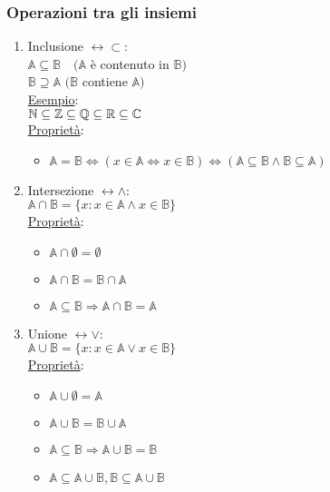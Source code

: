 \documentclass{article}
\begin{document}
\subsubsection*{Operazioni tra gli insiemi}
\begin{enumerate}
	\item Inclusione $\leftrightarrow\subset$:\\
		  $\mathbb{A}\subseteq\mathbb{B}\quad(\mathbb{A}$ è contenuto in $\mathbb{B})$\\
		  $\mathbb{B}\supseteq\mathbb{A}$ $(\mathbb{B}$ contiene $\mathbb{A})$\\
		  \underline{Esempio}:\\
		  $\mathbb{N}\subseteq\mathbb{Z}\subseteq\mathbb{Q}\subseteq\mathbb{R}\subseteq\mathbb{C}$\\
		  \underline{Proprietà}:
		  \begin{itemize}
			  \item $\mathbb{A}=\mathbb{B}\Leftrightarrow(x\in\mathbb{A}\Leftrightarrow x\in\mathbb{B})\Leftrightarrow(\mathbb{A}\subseteq\mathbb{B}\wedge\mathbb{B}\subseteq\mathbb{A})$
		  \end{itemize}
	\item Intersezione $\leftrightarrow\wedge$:\\
		  $\mathbb{A}\cap\mathbb{B}=\{x:x\in\mathbb{A}\wedge x\in\mathbb{B}\}$\\
		  \underline{Proprietà}:
		  \begin{itemize}
			  \item $\mathbb{A}\cap\emptyset=\emptyset$
			  \item $\mathbb{A}\cap\mathbb{B}=\mathbb{B}\cap\mathbb{A}$
			  \item $\mathbb{A}\subseteq\mathbb{B}\Rightarrow\mathbb{A}\cap\mathbb{B}=\mathbb{A}$
		  \end{itemize}
	\item Unione $\leftrightarrow\vee$:\\
		  $\mathbb{A}\cup\mathbb{B}=\{x:x\in\mathbb{A}\vee x\in\mathbb{B}\}$\\
		  \underline{Proprietà}:
		  \begin{itemize}
			  \item $\mathbb{A}\cup\emptyset=\mathbb{A}$
			  \item $\mathbb{A}\cup\mathbb{B}=\mathbb{B}\cup\mathbb{A}$
			  \item $\mathbb{A}\subseteq\mathbb{B}\Rightarrow\mathbb{A}\cup\mathbb{B}=\mathbb{B}$
			  \item $\mathbb{A}\subseteq\mathbb{A}\cup\mathbb{B},\mathbb{B}\subseteq\mathbb{A}\cup\mathbb{B}$

\end{itemize}
\end{enumerate}
\end{document}
